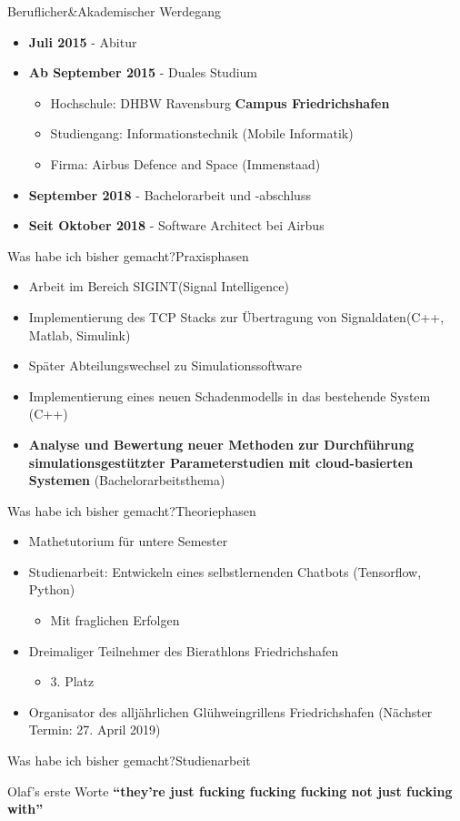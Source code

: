 \begin{frame}{Beruflicher\&Akademischer Werdegang}{}
	\begin{itemize}
		\item \textbf{Juli 2015} - Abitur
		\item \textbf{Ab September 2015} - Duales Studium
		\begin{itemize}
			\item Hochschule: DHBW Ravensburg \textbf{Campus Friedrichshafen}
			\item Studiengang: Informationstechnik (Mobile Informatik)
			\item Firma: Airbus Defence and Space (Immenstaad)
		\end{itemize}
		\item \textbf{September 2018} - Bachelorarbeit und -abschluss
		\item \textbf{Seit Oktober 2018} - Software Architect bei Airbus
	\end{itemize}
\end{frame}
	
\begin{frame}{Was habe ich bisher gemacht?}{Praxisphasen}
		\begin{itemize}
			\item Arbeit im Bereich SIGINT(Signal Intelligence)
			\item Implementierung des TCP Stacks zur Übertragung von Signaldaten(C++, Matlab, Simulink)
			\item Später Abteilungswechsel zu Simulationssoftware
			\item Implementierung eines neuen Schadenmodells in das bestehende System (C++)
			\item \textbf{Analyse und Bewertung neuer Methoden zur Durchführung simulationsgestützter Parameterstudien mit cloud-basierten Systemen} (Bachelorarbeitsthema)
		\end{itemize}
\end{frame}
	
\begin{frame}{Was habe ich bisher gemacht?}{Theoriephasen}
	\begin{itemize}[<+->]
		\item Mathetutorium für untere Semester
		\item Studienarbeit: Entwickeln eines selbstlernenden Chatbots (Tensorflow, Python)
		\begin{itemize}
			\item Mit fraglichen Erfolgen
		\end{itemize}
		\item Dreimaliger Teilnehmer des Bierathlons Friedrichshafen
		\begin{itemize}
			\item 3. Platz
		\end{itemize}
		\item Organisator des alljährlichen Glühweingrillens Friedrichshafen (Nächster Termin: 27. April 2019)
	\end{itemize}
\end{frame}
	
\begin{frame}{Was habe ich bisher gemacht?}{Studienarbeit}
	\begin{alertblock}{Olaf's erste Worte}
	\huge\textbf{"`they're just fucking fucking fucking not just fucking with"'}\par
	\end{alertblock}
\end{frame}